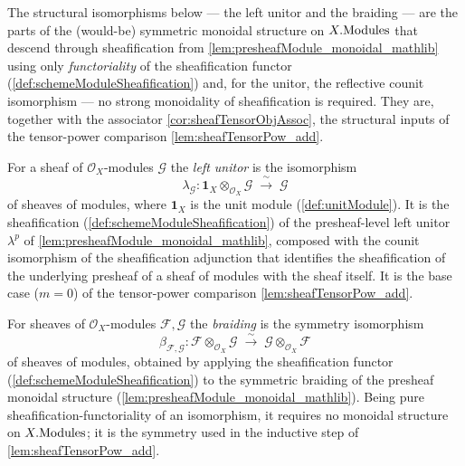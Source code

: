 The structural isomorphisms below --- the left unitor and the braiding --- are
the parts of the (would-be) symmetric monoidal structure on \(X.\mathrm{Modules}\) that
descend through sheafification from \cref{lem:presheafModule_monoidal_mathlib}
using only \emph{functoriality} of the sheafification functor
(\cref{def:schemeModuleSheafification}) and, for the unitor, the reflective
counit isomorphism --- no strong monoidality of sheafification is required. They
are, together with the associator \cref{cor:sheafTensorObjAssoc}, the structural
inputs of the tensor-power comparison \cref{lem:sheafTensorPow_add}.

\begin{definition}
  \label{def:tensorObjUnitIso}
  For a sheaf of \(\mathcal{O}_X\)-modules \(\mathcal{G}\) the \emph{left unitor}
  is the isomorphism
  \[
    \lambda_{\mathcal{G}} :
      \mathbf{1}_X \otimes_{\mathcal{O}_X} \mathcal{G}
      \;\xrightarrow{\ \sim\ }\; \mathcal{G}
  \]
  of sheaves of modules, where \(\mathbf{1}_X\) is the unit module
  (\cref{def:unitModule}). It is the sheafification
  (\cref{def:schemeModuleSheafification}) of the presheaf-level left unitor
  \(\lambda^p\) of \cref{lem:presheafModule_monoidal_mathlib}, composed with the
  counit isomorphism of the sheafification adjunction that identifies the
  sheafification of the underlying presheaf of a sheaf of modules with the sheaf
  itself. It is the base case (\(m = 0\)) of the tensor-power comparison
  \cref{lem:sheafTensorPow_add}.
\end{definition}

\begin{definition}
  \label{def:tensorBraiding}
  For sheaves of \(\mathcal{O}_X\)-modules \(\mathcal{F}, \mathcal{G}\) the
  \emph{braiding} is the symmetry isomorphism
  \[
    \beta_{\mathcal{F},\mathcal{G}} :
      \mathcal{F} \otimes_{\mathcal{O}_X} \mathcal{G}
      \;\xrightarrow{\ \sim\ }\;
      \mathcal{G} \otimes_{\mathcal{O}_X} \mathcal{F}
  \]
  of sheaves of modules, obtained by applying the sheafification functor
  (\cref{def:schemeModuleSheafification}) to the symmetric braiding of the
  presheaf monoidal structure (\cref{lem:presheafModule_monoidal_mathlib}). Being
  pure sheafification-functoriality of an isomorphism, it requires no monoidal
  structure on \(X.\mathrm{Modules}\); it is the symmetry used in the inductive step of
  \cref{lem:sheafTensorPow_add}.
\end{definition}

